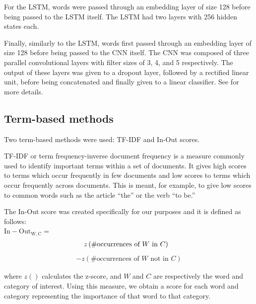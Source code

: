 \documentclass[letterpaper, 12 pt, conference]{ieeeconf}
\begin{document}
For the LSTM, words were passed through an embedding layer of size 128 before being passed to the LSTM itself. The LSTM had two layers with 256 hidden states each.

Finally, similarly to the LSTM, words first passed through an embedding layer of size 128 before being passed to the CNN itself. The CNN was composed of three parallel convolutional layers with filter sizes of 3, 4, and 5 respectively. The output of these layers was given to a dropout layer, followed by a rectified linear unit, before being concatenated and finally given to a linear classifier. See \cite{huang:aim:2018} for more details.

\subsection{Term-based methods}
Two term-based methods were used: TF-IDF \cite{baeza:tfidf:1999} and In-Out scores.

TF-IDF or term frequency-inverse document frequency is a measure commonly used to identify important terms within a set of documents. It gives high scores to terms which occur frequently in few documents and low scores to terms which occur frequently across documents. This is meant, for example, to give low scores to common words such as the article ``the'' or the verb ``to be.''

The In-Out score was created specifically for our purposes and it is defined as follows:\\[2em]
$\mathrm{In}-\mathrm{Out_{W, C}} =$
\begin{align*}\hspace{-.30cm}
z \left(\# \textrm{occurrences of } W \textrm{ in } C\right)
\end{align*}\vspace{-1cm}
\begin{align*}
- z \left(\# \textrm{occurrences of } W \textrm{ not in } C\right)
\end{align*}

where $z()$ calculates the z-score, and $W$ and $C$ are respectively the word and category of interest. Using this measure, we obtain a score for each word and category representing the importance of that word to that category.
\end{document}

